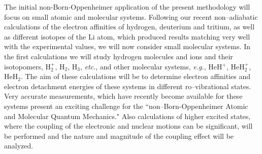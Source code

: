 The initial non-Born-Oppenheimer 
application of the present methodology 
will focus on
small atomic and molecular systems.
Following our recent non--adiabatic calculations
of the electron affinities of hydrogen, deuterium and tritium,
as well as different isotopes of the Li atom,
which produced results matching very well with the experimental
values, we will now consider small molecular systems.
In the first calculations 
we will study
hydrogen molecules and ions and their isotopomers,
H$_2^+$, H$_2$, H$_3$, {\it etc.}, 
and other molecular systems, {\it e.g.}, HeH$^+$, HeH$_2^+$, HeH$_2$.  
The aim of these calculations will be to determine 
electron affinities and electron detachment energies 
of these systems in different ro--vibrational states.
Very accurate measurements, which have 
recently become
available 
for these systems
present an exciting challenge for 
the ``non--Born-Oppenheimer Atomic and Molecular Quantum Mechanics."
Also calculations of 
higher excited states,
where the coupling of the electronic and nuclear motions
can be significant, 
will be performed and the nature and magnitude of the 
coupling effect will be 
analyzed.


%



